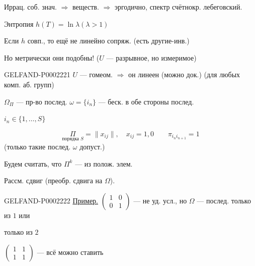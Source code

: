 Иррац. соб. знач. $\Rightarrow$ веществ. $\Rightarrow$ эргодично, спектр
счётнокр. лебеговский.



Энтропия $h(T)=\ln\lambda$\quad $(\lambda>1)$





Если $h$ совп., то ещё не линейно сопряж. (есть другие-инв.)

Но метрически они подобны! ($U$ — разрывное, но измеримое)

\begin{GelfandAdjacentEvidence}{GELFAND-P000222}{1}
$U$ — гомеом. $\Longrightarrow$ он линеен (можно док.)
(для любых комп. аб. групп)
\end{GelfandAdjacentEvidence}

$\Omega_\Pi$ — пр-во послед. $\omega=\{i_n\}$ — беск. в обе стороны послед.

$i_n\in\{1,\ldots,S\}$



\begin{equation*}
 \underset{\text{порядка }S}{\Pi}=\|x_{ij}\|,\quad x_{ij}=1,0
 \qquad \pi_{i_n i_{n+1}}=1
\end{equation*}
(только такие послед. $\omega$ допуст.)



Будем считать, что $\Pi^k$ — из полож. элем.

Рассм. сдвиг (преобр. сдвига на $\Omega$).



\begin{GelfandAdjacentEvidence}{GELFAND-P000222}{2}
\underline{Пример.}\quad
$\begin{pmatrix}1&0\\0&1\end{pmatrix}$ — не уд. усл., но $\Omega$ — послед.
только из $1$ или 
\end{GelfandAdjacentEvidence}
 только из $2$



$\begin{pmatrix}1&1\\1&1\end{pmatrix}$ — всё можно ставить



